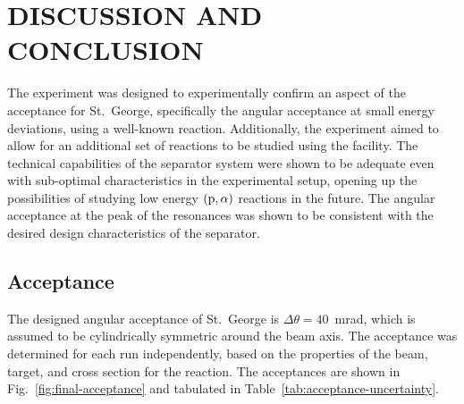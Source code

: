 \chapter{DISCUSSION AND CONCLUSION}
\label{ch:discussion-and-conclusion}

The experiment was designed to experimentally confirm an aspect of the
acceptance for St.\ George, specifically the angular acceptance at small
energy deviations, using a well-known reaction. Additionally, the
experiment aimed to allow for an additional set of reactions to be
studied using the facility. The technical capabilities of the separator
system were shown to be adequate even with sub-optimal characteristics
in the experimental setup, opening up the possibilities of studying low
energy $({\rm p},\alpha)$ reactions in the future. The angular
acceptance at the peak of the resonances was shown to be consistent with
the desired design characteristics of the separator.


\section{Acceptance}

The designed angular acceptance of St.\ George is $\Delta\theta =
40$~mrad, which is assumed to be cylindrically symmetric around the beam
axis. The acceptance was determined for each run independently, based on
the properties of the beam, target, and cross section for the \alpa{}
reaction. The acceptances are shown in Fig.~\ref{fig:final-acceptance}
and tabulated in Table~\ref{tab:acceptance-uncertainty}.

